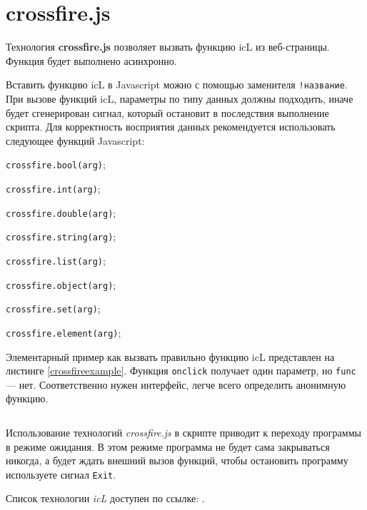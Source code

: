 \section{crossfire.js}

Технология {\bf crossfire.js} позволяет вызвать функцию icL из веб-страницы. Функция будет выполнено асинхронно.

Вставить функцию icL в Javascript можно с помощью заменителя \texttt{!{название}}. При вызове функций icL, параметры по типу данных должны подходить, иначе будет сгенерирован сигнал, который остановит в последствия выполнение скрипта. Для корректность восприятия данных рекомендуется использовать следующее функций Javascript:
\begin{icItems}
	\item \texttt{crossfire.bool(arg)};
	\item \texttt{crossfire.int(arg)};
	\item \texttt{crossfire.double(arg)};
	\item \texttt{crossfire.string(arg)};
	\item \texttt{crossfire.list(arg)};
	\item \texttt{crossfire.object(arg)};
	\item \texttt{crossfire.set(arg)};
	\item \texttt{crossfire.element(arg)};
\end{icItems}

Элементарный пример как вызвать правильно функцию icL представлен на листинге \ref{crossfireexample}. Функция \texttt{onclick} получает один параметр, но \texttt{func} — нет. Соответственно нужен интерфейс, легче всего определить анонимную функцию.

\begin{sourcecode}
	\label{crossfireexample}
    \inputminted[linenos]{icl}{../sources/crossfireexample.icL}
\end{sourcecode}

Использование технологий \textit{crossfire.js} в скрипте приводит к переходу программы в режиме ожидания. В этом режиме программа не будет сама закрываться никогда, а будет ждать внешний вызов функций, чтобы остановить программу используете сигнал \texttt{Exit}.

Список технологии \textit{icL} доступен по ссылке: .
